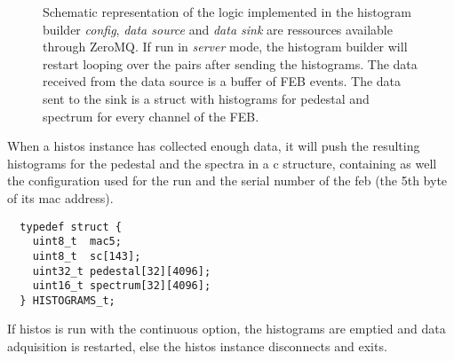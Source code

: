 \begin{figure}
  \caption{%
    Schematic representation of the logic implemented in the histogram builder
    \emph{config}, \emph{data source} and \emph{data sink} are ressources available through ZeroMQ.
    If run in \emph{server} mode, the histogram builder will restart looping over the pairs after sending the histograms.
    The data received from the data source is a buffer of FEB events.
    The data sent to the sink is a struct with histograms for pedestal and spectrum for every channel of the FEB.
  }
  \label{fig:histos_logic}
\end{figure}

When a histos instance has collected enough data, it will push the resulting histograms for the pedestal and the spectra in a c structure, containing as well the configuration used for the run and the serial number of the \gls{feb} (the 5th byte of its mac address).
\begin{verbatim}
  typedef struct {
    uint8_t  mac5;
    uint8_t  sc[143];
    uint32_t pedestal[32][4096];
    uint16_t spectrum[32][4096];
  } HISTOGRAMS_t;
\end{verbatim}
If histos is run with the continuous option, the histograms are emptied and data adquisition is restarted, else the histos instance disconnects and exits.

